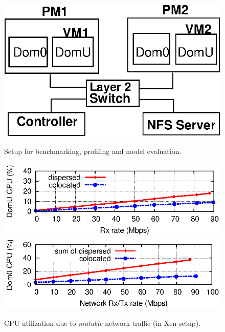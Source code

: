 \begin{figure}
	\RawFloats
	\begin{minipage}{0.45\textwidth}
		\centering
		\includegraphics[scale=0.575]{jss-figures/benchmark}
		\caption{Setup for benchmarking, profiling and model evaluation.}
		\label{fig:setup}
	\end{minipage}
	\begin{minipage}{0.5\textwidth}
		\centering
		\includegraphics[scale=0.9]{arescue-figures/aff-benchmark/domU-cpu-vs-affine-rx-curve.eps}
		\includegraphics[scale=0.9]{arescue-figures/aff-benchmark/dom0-cpu-vs-affine-curve.eps}
		\caption{CPU utilization due to \textit{mutable} network traffic (in Xen setup).}
		\label{fig:cpuovhd-rxtx}
	\end{minipage}
\end{figure}	

